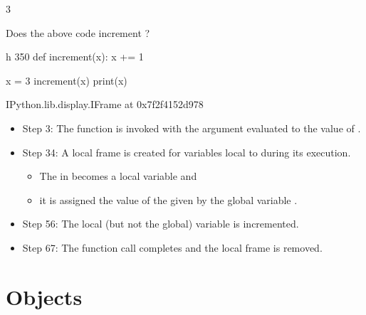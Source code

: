 \documentclass[letterpaper,10pt,english]{sphinxmanual}
\begin{document}
\begin{sphinxVerbatim}[commandchars=\\\{\}]
3
\end{sphinxVerbatim}

Does the above code increment ?

\begin{sphinxVerbatim}[commandchars=\\\{\}]
 \PYGZhy{}h 350
def increment(x):
    x += 1


x = 3
increment(x)
print(x)
\end{sphinxVerbatim}

\begin{sphinxVerbatim}[commandchars=\\\{\}]
\PYGZlt{}IPython.lib.display.IFrame at 0x7f2f4152d978\PYGZgt{}
\end{sphinxVerbatim}
\begin{itemize}
\item {} 
Step 3: The function  is invoked with the argument evaluated to the value of .

\item {} 
Step 3\sphinxhyphen{}4: A local frame is created for variables local to  during its execution.
\begin{itemize}
\item {} 
The   in  becomes a local variable and

\item {} 
it is assigned the value  of the  given by the global variable .

\end{itemize}

\item {} 
Step 5\sphinxhyphen{}6: The local (but not the global) variable  is incremented.

\item {} 
Step 6\sphinxhyphen{}7: The function call completes and the local frame is removed.

\end{itemize}


\chapter{Objects}
\label{\detokenize{Lecture5/Objects:objects}}\label{\detokenize{Lecture5/Objects::doc}}
\end{document}
